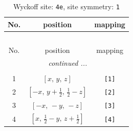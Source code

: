 \documentclass[fleqn,8pt]{jsarticle}
\begin{document}
\begin{longtable}{ccc}
\caption{Wyckoff site: {\tt 4e}, site symmetry: {\tt 1}}
 \\
 \hline \hline
No. & position & mapping \\ \hline \endfirsthead

\multicolumn{2}{l}{\tablename\ \thetable{}} \\
 \hline \hline
No. & position & mapping \\ \hline \endhead

 \hline \hline
\multicolumn{2}{r}{\footnotesize\it continued ...} \\ \endfoot

 \hline \hline
\multicolumn{2}{r}{} \\ \endlastfoot

1 & $\left[ x,\, y,\, z \right]$ & {\tt [1]} \\ \hline
2 & $\left[ - x,\, y + \frac{1}{2},\, \frac{1}{2} - z \right]$ & {\tt [2]} \\ \hline
3 & $\left[ - x,\, - y,\, - z \right]$ & {\tt [3]} \\ \hline
4 & $\left[ x,\, \frac{1}{2} - y,\, z + \frac{1}{2} \right]$ & {\tt [4]} \\
\end{longtable}
\end{document}
